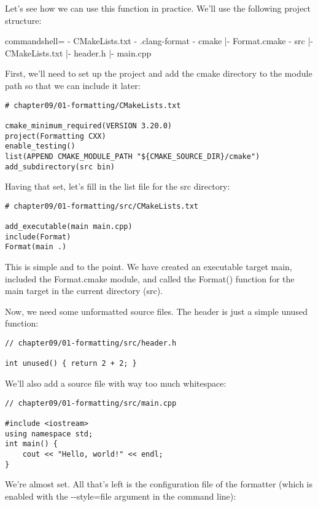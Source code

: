 Let's see how we can use this function in practice. We'll use the following project structure:

\begin{tcblisting}{commandshell={}}
- CMakeLists.txt
- .clang-format
- cmake
    |- Format.cmake
- src
    |- CMakeLists.txt
    |- header.h
    |- main.cpp
\end{tcblisting}

First, we'll need to set up the project and add the cmake directory to the module path so that we can include it later:

\begin{lstlisting}[style=styleCMake]
# chapter09/01-formatting/CMakeLists.txt

cmake_minimum_required(VERSION 3.20.0)
project(Formatting CXX)
enable_testing()
list(APPEND CMAKE_MODULE_PATH "${CMAKE_SOURCE_DIR}/cmake")
add_subdirectory(src bin)
\end{lstlisting}

Having that set, let's fill in the list file for the src directory:

\begin{lstlisting}[style=styleCMake]
# chapter09/01-formatting/src/CMakeLists.txt

add_executable(main main.cpp)
include(Format)
Format(main .)
\end{lstlisting}

This is simple and to the point. We have created an executable target main, included the Format.cmake module, and called the Format() function for the main target in the current directory (src).

Now, we need some unformatted source files. The header is just a simple unused function:

\begin{lstlisting}[style=styleCXX]
// chapter09/01-formatting/src/header.h

int unused() { return 2 + 2; }
\end{lstlisting}

We'll also add a source file with way too much whitespace:

\begin{lstlisting}[style=styleCXX]
// chapter09/01-formatting/src/main.cpp

#include <iostream>
using namespace std;
int main() {
	cout << "Hello, world!" << endl;
}
\end{lstlisting}

We're almost set. All that's left is the configuration file of the formatter (which is enabled with the -{}-style=file argument in the command line):

